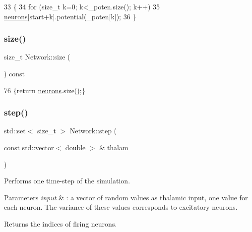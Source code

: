 \begin{DoxyCode}
33                                                                             \{
34     \textcolor{keywordflow}{for} (\textcolor{keywordtype}{size\_t} k=0; k<\_poten.size(); k++) 
35         \hyperlink{classNetwork_a1b7832bc2c7b8855cdc3b2d6329eff9d}{neurons}[start+k].potential(\_poten[k]);
36 \}
\end{DoxyCode}
\mbox{\label{classNetwork_a41c54d12d861883170b5c5abca3a7bc8}} 
\subsubsection{\texorpdfstring{size()}{size()}}
{\footnotesize\ttfamily size\+\_\+t Network\+::size (\begin{DoxyParamCaption}{ }\end{DoxyParamCaption}) const\hspace{0.3cm}{\ttfamily [inline]}}


\begin{DoxyCode}
76 \{\textcolor{keywordflow}{return} \hyperlink{classNetwork_a1b7832bc2c7b8855cdc3b2d6329eff9d}{neurons}.size();\}
\end{DoxyCode}
\mbox{\label{classNetwork_a4614f267a2238b8a10dfea23b54defac}} 
\subsubsection{\texorpdfstring{step()}{step()}}
{\footnotesize\ttfamily std\+::set$<$ size\+\_\+t $>$ Network\+::step (\begin{DoxyParamCaption}\item[{const std\+::vector$<$ double $>$ \&}]{thalam }\end{DoxyParamCaption})}

Performs one time-\/step of the simulation. 
\begin{DoxyParams}{Parameters}
{\em input} & \+: a vector of random values as thalamic input, one value for each neuron. The variance of these values corresponds to excitatory neurons. \\
\hline
\end{DoxyParams}
\begin{DoxyReturn}{Returns}
the indices of firing neurons. 
\end{DoxyReturn}

